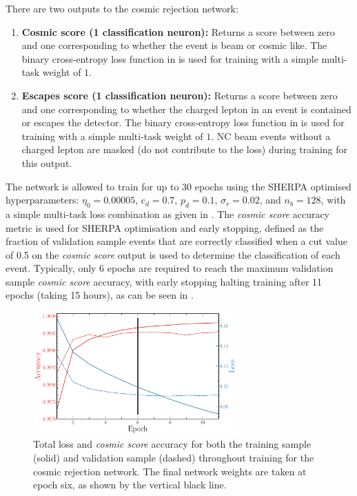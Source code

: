 There are two outputs to the cosmic rejection network:
\begin{enumerate}
    \item \textbf{Cosmic score (1 classification neuron):} Returns a score between zero and one
          corresponding to whether the event is beam or cosmic like. The binary cross-entropy loss
          function in  is used for training with a simple
          multi-task weight of $1$.
    \item \textbf{Escapes score (1 classification neuron):} Returns a score between zero and one
          corresponding to whether the charged lepton in an event is contained or escapes the
          detector. The binary cross-entropy loss function in
           is used for training with a simple multi-task
          weight of $1$. NC beam events without a charged lepton are masked (do not contribute to
          the loss) during training for this output.
\end{enumerate}

The network is allowed to train for up to 30 epochs using the SHERPA optimised hyperparameters:
$\eta_{0}=0.00005$, $c_{d}=0.7$, $p_{d}=0.1$, $\sigma_{r}=0.02$, and $n_{b}=128$, with a simple
multi-task loss combination as given in . The \emph{cosmic score}
accuracy metric is used for SHERPA optimisation and early stopping, defined as the fraction of
validation sample events that are correctly classified when a cut value of 0.5 on the \emph{cosmic
score} output is used to determine the classification of each event. Typically, only 6 epochs are
required to reach the maximum validation sample \emph{cosmic score} accuracy, with early stopping
halting training after 11 epochs (taking 15 hours), as can be seen in
.

\begin{figure} %
    \includegraphics[width=0.7\textwidth]{diagrams/7-results/final_cosmic_history.pdf}
    \caption[Loss and accuracy throughout training for the cosmic rejection network]
    {Total loss and \emph{cosmic score} accuracy for both the training sample (solid) and
        validation sample (dashed) throughout training for the cosmic rejection network. The final
        network weights are taken at epoch six, as shown by the vertical black line.}
    \label{fig:final_cosmic_history}
\end{figure}

